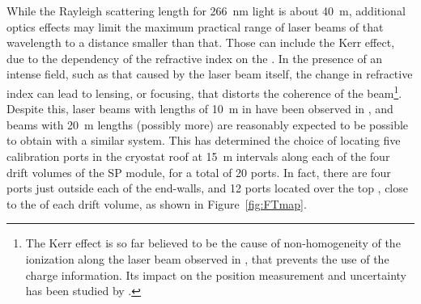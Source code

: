 




While the Rayleigh scattering length for \SI{266}{\nano\m}  light is about \SI{40}{\m}, additional optics effects may limit the maximum practical range of laser beams of that wavelength to a distance smaller than that. Those can include the Kerr effect,  due to the dependency of the refractive index on the \efield. In the presence of an intense field, such as that caused by the laser beam itself, the change in refractive index can lead to lensing, or focusing, that distorts the coherence of the beam\footnote{The Kerr effect is so far believed to be the cause of non-homogeneity of the ionization along the laser beam observed in , that prevents the use of the charge information. Its impact on the position measurement and \efield uncertainty has been studied by .}. 
Despite this, laser beams with lengths of \SI{10}{\m} in  have been observed in , and beams with \SI{20}{\m} lengths (possibly more) are reasonably expected to be possible to obtain with a similar system.
This has determined the choice of locating five calibration ports in the cryostat roof at \SI{15}{\m} intervals along each of the four drift volumes of the SP module, for a total of \num{20} ports. In fact, there are four ports just outside each of the  end-walls, and \num{12} ports located over the top , close to the  of each drift volume, as shown in Figure~\ref{fig:FTmap}.



